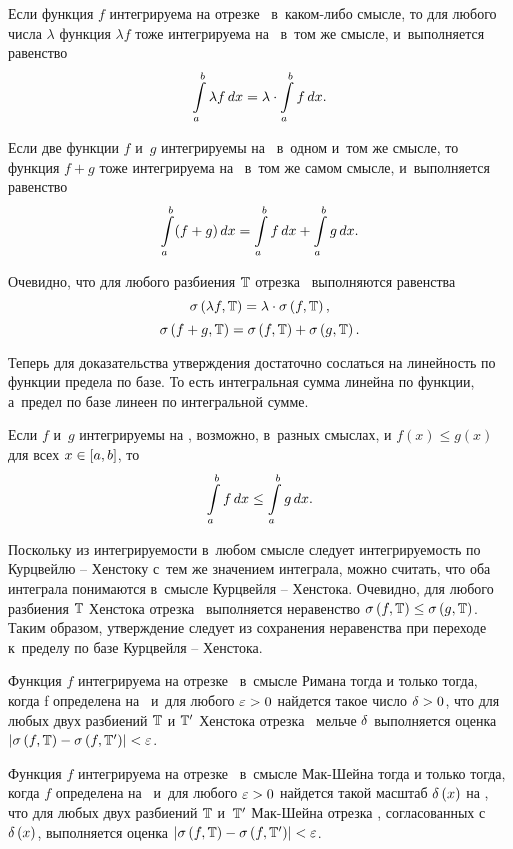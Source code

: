 \documentclass[draft]{article}
\begin{document}
Если функция $f$ интегрируема на отрезке \ab\ в~каком-либо смысле,
то для любого числа $\lambda$ функция $\lambda f$ тоже интегрируема
на \ab\ в~том же смысле, и~выполняется равенство
$$\intd[a,b]\lambda f,x=\lambda\cdot\intabfdx.$$

Если две функции $f$ и~$g$ интегрируемы на \ab\ в~одном и~том же
смысле, то функция $f+g$ тоже интегрируема на \ab\ в~том же самом
смысле, и~выполняется равенство
$$\intd[a,b](f+g),x=\intabfdx+\intabgdx.$$

\pr

Очевидно, что для любого разбиения $\mathbb{T}$ отрезка \ab\ выполняются
равенства
$$\isum(\lambda f,\T)=\lambda\cdot\isfT,$$
$$\isum(f+g,\T)=\isfT+\isgT.$$

Теперь для доказательства утверждения достаточно сослаться на
линейность по функции предела по базе. То есть интегральная сумма
линейна по функции, а~предел по базе линеен по интегральной сумме.

\prut

\bigskip


Если $f$ и~$g$ интегрируемы на \ab, возможно, в~разных смыслах, и
$f(x)\le g(x)$ для всех $x\in\segab$, то
$$\intabfdx\le\intabgdx.$$

\pr

Поскольку из интегрируемости в~любом смысле следует интегрируемость
по Курцвейлю -- Хенстоку с~тем же значением интеграла, можно
считать, что оба интеграла понимаются в~смысле Курцвейля --
Хенстока. Очевидно, для любого разбиения $\mathbb{T}$ Хенстока отрезка \ab\
выполняется неравенство $\isfT\le\isgT$. Таким образом, утверждение
следует из сохранения неравенства при переходе к~пределу по базе
Курцвейля -- Хенстока.

\prut

\eject


\smallskip

Функция $f$ интегрируема на отрезке \ab\ в~смысле Римана тогда и
только тогда, когда f определена на \ab\ и~для любого $\varepsilon > 0$
найдется такое число $\delta > 0$, что для любых двух разбиений $\mathbb{T}$ и
$\mathbb{T}'$ Хенстока отрезка \ab\ мельче $\delta$ выполняется оценка
$\abs{\isfT-\isfTp}<\ep$.

\smallskip

Функция $f$ интегрируема на отрезке \ab\ в~смысле Мак-Шейна тогда и
только тогда, когда $f$ определена на \ab\ и~для любого $\varepsilon > 0$
найдется такой масштаб $\dex$ на \ab, что для любых двух разбиений
$\mathbb{T}$ и~$\mathbb{T}'$ Мак-Шейна отрезка \ab, согласованных с~$\dex$,
выполняется оценка $\abs{\isfT-\isfTp}<\ep$.
\end{document}
